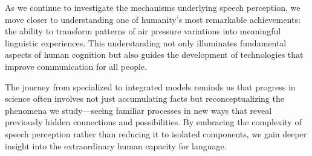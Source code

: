 \documentclass[12pt,a4paper]{article}
\begin{document}
As we continue to investigate the mechanisms underlying speech perception, we move closer to understanding one of humanity's most remarkable achievements: the ability to transform patterns of air pressure variations into meaningful linguistic experiences. This understanding not only illuminates fundamental aspects of human cognition but also guides the development of technologies that improve communication for all people.

The journey from specialized to integrated models reminds us that progress in science often involves not just accumulating facts but reconceptualizing the phenomena we study—seeing familiar processes in new ways that reveal previously hidden connections and possibilities. By embracing the complexity of speech perception rather than reducing it to isolated components, we gain deeper insight into the extraordinary human capacity for language.
\end{document}
